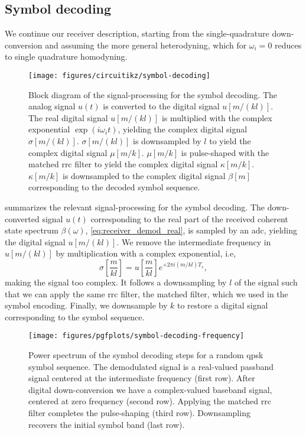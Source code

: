 \FloatBarrier
\subsection{Symbol decoding}

We continue our receiver description, starting from the single-quadrature down-conversion and assuming the more general heterodyning, which for $\omega_i=0$ reduces to single quadrature homodyning.
\begin{figure}[htb]
	\centering
	\texttt{[image: figures/circuitikz/symbol-decoding]}
	\caption{Block diagram of the signal-processing for the symbol decoding. The analog signal $u(t)$ is converted to the digital signal $u[m/(kl)]$. The real digital signal $u[m/(kl)]$ is multiplied with the complex exponential $\exp(i\omega_it)$, yielding the complex digital signal $\sigma[m/(kl)]$. $\sigma[m/(kl)]$ is downsampled by $l$ to yield the complex digital signal $\mu[m/k]$. $\mu[m/k]$ is pulse-shaped with the matched \gls{rrc} filter to yield the complex digital signal $\kappa[m/k]$. $\kappa[m/k]$ is downsampled to the complex digital signal $\beta[m]$ corresponding to the decoded symbol sequence.}\label{fig:symbol_decoding_blocks}
\end{figure}
 summarizes the relevant signal-processing for the symbol decoding.
The down-converted signal $u(t)$ corresponding to the real part of the received coherent state spectrum $\beta(\omega)$, \cref{eq:receiver_demod_real}, is sampled by an \gls{adc}, yielding the digital signal $u[m/(kl)]$.
We remove the intermediate frequency in $u[m/(kl)]$ by multiplication with a complex exponential, i.e,
\begin{equation}
	\sigma\left[\frac{m}{kl}\right]
	=
	u\left[\frac{m}{kl}\right]
	e^{+2\pi i (m/kl) T_s}
	,
\end{equation}
making the signal too complex.
It follows a downsampling by $l$ of the signal such that we can apply the same \gls{rrc} filter, the matched filter, which we used in the symbol encoding.
Finally, we downsample by $k$ to restore a digital signal corresponding to the symbol sequence.
\begin{figure}[htb]
	\centering
	\texttt{[image: figures/pgfplots/symbol-decoding-frequency]}
	\caption{Power spectrum of the symbol decoding steps for a random \gls{qpsk} symbol sequence. The demodulated signal is a real-valued passband signal centered at the intermediate frequency (first row). After digital down-conversion we have a complex-valued baseband signal, centered at zero frequency (second row). Applying the matched \gls{rrc} filter completes the pulse-shaping (third row). Downsampling recovers the initial symbol band (last row).}\label{fig:symbol_decoding_frequency}
\end{figure}

